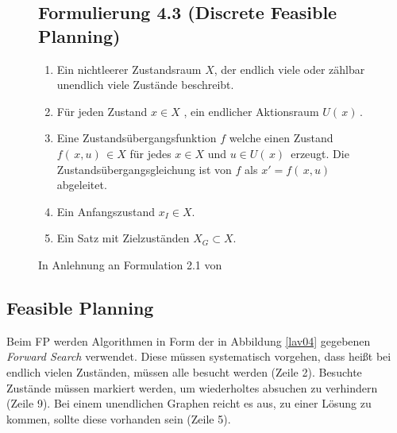 \begin{figure}
\centering
\subsection*{Formulierung 4.3 (Discrete Feasible Planning)}
\begin{enumerate}
	\item Ein nichtleerer Zustandsraum $X$, der endlich viele oder zählbar unendlich viele Zustände beschreibt.  
	\item Für jeden Zustand $x \in X$ , ein endlicher Aktionsraum $U( \, x) \,$.
	\item Eine Zustandsübergangsfunktion $f$ welche einen Zustand  $f( \, x,u) \, \in X$ für jedes $x \in X$  und $u \in U( \, x) \,$ erzeugt. Die Zustandsübergangsgleichung ist von $f$ als $x' = f( \, x,u )\, $ abgeleitet.
	\item Ein Anfangszustand $ x_{I} \in X$.
	\item Ein Satz mit Zielzuständen $X_{G} \subset X$.
\end{enumerate}
\caption{In Anlehnung an Formulation 2.1 von \cite[~S. 29]{Lav06}}
\label{lav03}
\end{figure}

\subsection {Feasible Planning}
Beim FP werden Algorithmen in Form der in Abbildung \ref{lav04} gegebenen \textit{Forward Search} verwendet. Diese müssen systematisch vorgehen, dass heißt bei endlich vielen Zuständen, müssen alle besucht werden (Zeile 2). Besuchte Zustände müssen markiert werden, um wiederholtes absuchen zu verhindern (Zeile 9). Bei einem unendlichen Graphen reicht es aus, zu einer Lösung zu kommen, sollte diese vorhanden sein (Zeile 5).\cite[~S. 32]{Lav06}

